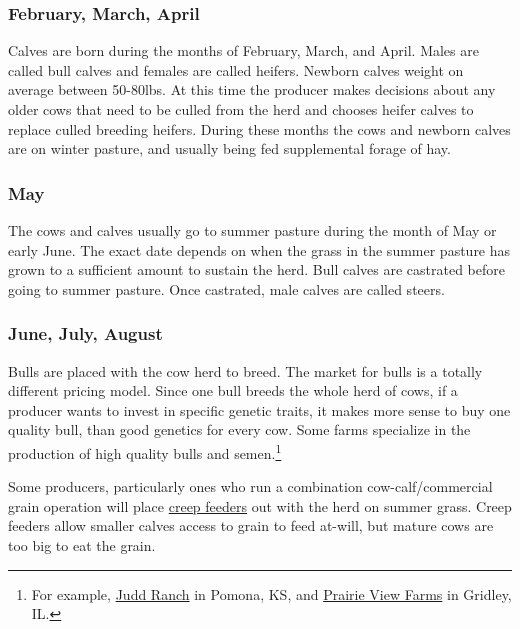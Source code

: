 \documentclass[
  letterpaper,
  DIV=11,
  numbers=noendperiod]{scrreprt}
\begin{document}
\hypertarget{february-march-april}{%
\subsubsection{February, March, April}\label{february-march-april}}

Calves are born during the months of February, March, and April. Males
are called bull calves and females are called heifers. Newborn calves
weight on average between 50-80lbs. At this time the producer makes
decisions about any older cows that need to be culled from the herd and
chooses heifer calves to replace culled breeding heifers. During these
months the cows and newborn calves are on winter pasture, and usually
being fed supplemental forage of hay.

\hypertarget{may}{%
\subsubsection{May}\label{may}}

The cows and calves usually go to summer pasture during the month of May
or early June. The exact date depends on when the grass in the summer
pasture has grown to a sufficient amount to sustain the herd. Bull
calves are castrated before going to summer pasture. Once castrated,
male calves are called steers.

\hypertarget{june-july-august}{%
\subsubsection{June, July, August}\label{june-july-august}}

Bulls are placed with the cow herd to breed. The market for bulls is a
totally different pricing model. Since one bull breeds the whole herd of
cows, if a producer wants to invest in specific genetic traits, it makes
more sense to buy one quality bull, than good genetics for every cow.
Some farms specialize in the production of high quality bulls and
semen.\footnote{For example, \href{http://www.juddranch.com/}{Judd
  Ranch} in Pomona, KS, and \href{http://www.pvfangus.com/}{Prairie View
  Farms} in Gridley, IL.}

Some producers, particularly ones who run a combination
cow-calf/commercial grain operation will place
\href{https://www.google.com/search?q=creep+feeder\&espv=2\&biw=1920\&bih=1075\&source=lnms\&tbm=isch\&sa=X\&ved=0CAcQ_AUoAmoVChMI18ne2paTyQIVSJUeCh3eMw5X}{creep
feeders} out with the herd on summer grass. Creep feeders allow smaller
calves access to grain to feed at-will, but mature cows are too big to
eat the grain.
\end{document}

